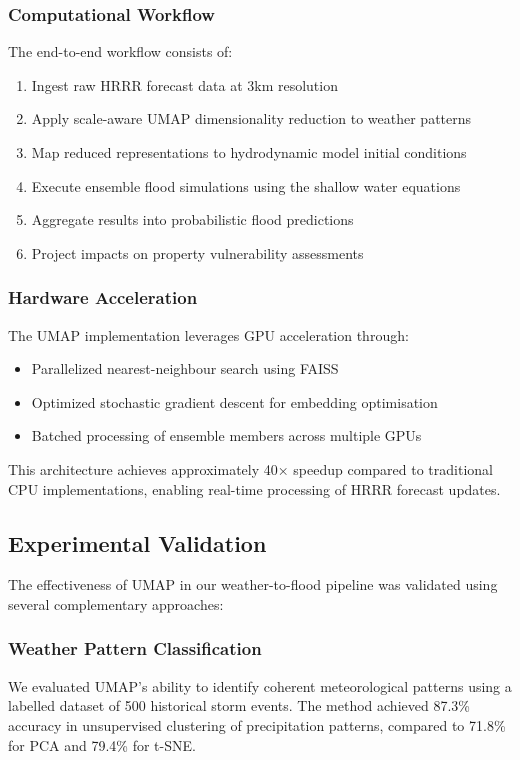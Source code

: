 \documentclass{article}
\begin{document}
\subsubsection{Computational Workflow}
The end-to-end workflow consists of:
\begin{enumerate}
\item Ingest raw HRRR forecast data at 3km resolution
\item Apply scale-aware UMAP dimensionality reduction to weather patterns
\item Map reduced representations to hydrodynamic model initial conditions
\item Execute ensemble flood simulations using the shallow water equations
\item Aggregate results into probabilistic flood predictions
\item Project impacts on property vulnerability assessments
\end{enumerate}

\subsubsection{Hardware Acceleration}
The UMAP implementation leverages GPU acceleration through:
\begin{itemize}
\item Parallelized nearest-neighbour search using FAISS
\item Optimized stochastic gradient descent for embedding optimisation
\item Batched processing of ensemble members across multiple GPUs
\end{itemize}

This architecture achieves approximately 40× speedup compared to traditional CPU implementations, enabling real-time processing of HRRR forecast updates.

\subsection{Experimental Validation}
The effectiveness of UMAP in our weather-to-flood pipeline was validated using several complementary approaches:

\subsubsection{Weather Pattern Classification}
We evaluated UMAP's ability to identify coherent meteorological patterns using a labelled dataset of 500 historical storm events. The method achieved 87.3\% accuracy in unsupervised clustering of precipitation patterns, compared to 71.8\% for PCA and 79.4\% for t-SNE.
\end{document}
